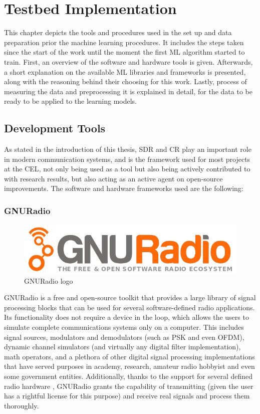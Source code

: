 \acresetall
\chapter{Testbed Implementation}\label{chapter:implementation}\label{ch:implementation}
This chapter depicts the tools and procedures used in the set up and data preparation prior the machine learning procedures. It includes the steps taken since the start of the work until the moment the first \ac{ML} algorithm started to train. First, an overview of the software and hardware tools is given. Afterwards, a short explanation on the available \ac{ML} libraries and frameworks is presented, along with the reasoning behind their choosing for this work. Lastly, process of measuring the data and preprocessing it is explained in detail, for the data to be ready to be applied to the learning models.
\section{Development Tools}\label{ch:tools}
As stated in the introduction of this thesis, \ac{SDR} and \ac{CR} play an important role in modern communication systems, and is the framework used for most projects at the \ac{CEL}, not only being used as a tool but also being actively contributed to with research results, but also acting as an active agent on open-source improvements. The software and hardware frameworks used are the following:
\subsection{GNURadio}
\begin{figure}[htb]
    \centering
      \includegraphics[width=\textwidth]{figures/gnuradio_logo}
      \caption{GNURadio logo}
      \label{fig:gnuradio}
\end{figure}
GNURadio \cite{GNURadio2016} is a free and open-source toolkit that provides a large library of signal processing blocks that can be used for several software-defined radio applications. Its functionality does not require a device in the loop, which allows the users to simulate complete communications systems only on a computer. This includes signal sources, modulators and demodulators (such as \ac{PSK} and even \ac{OFDM}), dynamic channel simulators (and virtually any digital filter implementation), math operators, and a plethora of other digital signal processing implementations that have served purposes in academy, research, amateur radio hobbyist and even some government entities. Additionally, thanks to the support for several defined radio hardware \cite{gnuradiohw}, GNURadio grants the capability of transmitting (given the user has a rightful license for this purpose) and receive real signals and process them thoroughly.\\

